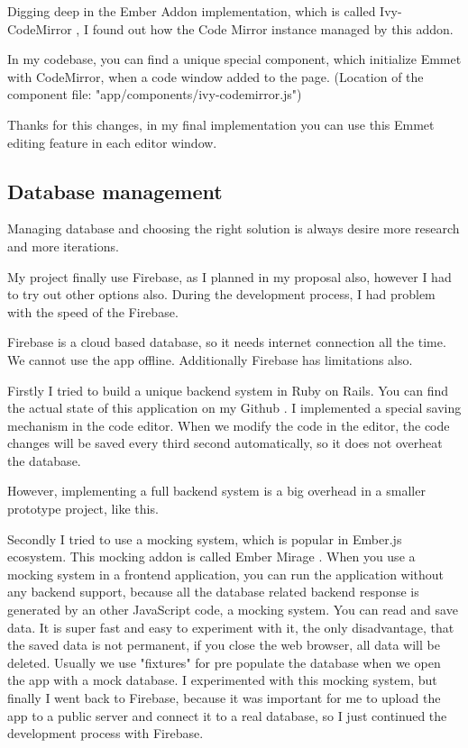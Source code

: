 \documentclass[12pt, a4paper, oneside, openright, medskipamount]{report}
\begin{document}
Digging deep in the Ember Addon implementation, which is called Ivy-CodeMirror \cite{ivy-codemirror}, I found out how the Code Mirror instance managed by this addon.

In my codebase, you can find a unique special component, which initialize Emmet with CodeMirror, when a code window added to the page. (Location of the component file: "app/components/ivy-codemirror.js")

Thanks for this changes, in my final implementation you can use this Emmet editing feature in each editor window.

\subsection{Database management}

Managing database and choosing the right solution is always desire more research and more iterations.

My project finally use Firebase, as I planned in my proposal also, however I had to try out other options also. During the development process, I had problem with the speed of the Firebase.

Firebase is a cloud based database, so it needs internet connection all the time. We cannot use the app offline. Additionally Firebase has limitations also.

Firstly I tried to build a unique backend system in Ruby on Rails. You can find the actual state of this application on my Github \cite{tutorial-builder-backend}. I implemented a special saving mechanism in the code editor. When we modify the code in the editor, the code changes will be saved every third second automatically, so it does not overheat the database.

However, implementing a full backend system is a big overhead in a smaller prototype project, like this.

Secondly I tried to use a mocking system, which is popular in Ember.js ecosystem. This mocking addon is called Ember Mirage \cite{ember-mirage}. When you use a mocking system in a frontend application, you can run the application without any backend support, because all the database related backend response is generated by an other JavaScript code, a mocking system. You can read and save data. It is super fast and easy to experiment with it, the only disadvantage, that the saved data is not permanent, if you close the web browser, all data will be deleted. Usually we use "fixtures" for pre populate the database when we open the app with a mock database. I experimented with this mocking system, but finally I went back to Firebase, because it was important for me to upload the app to a public server and connect it to a real database, so I just continued the development process with Firebase.
\end{document}
